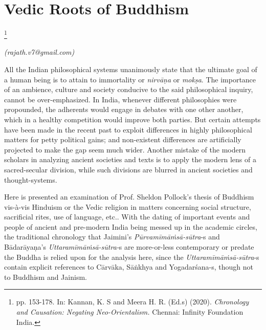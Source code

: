 
\chapter{Vedic Roots of Buddhism}\label{chapter5}

\footnote{pp. 153-178. In: Kannan, K. S and Meera H. R. (Ed.s) (2020). \textit{Chronology and Causation: Negating Neo-Orientalism.} Chennai: Infinity Foundation India.}

\begin{flushright}
\textit{(rajath.v7@gmail.com)}
\end{flushright}

\setcounter{endnote}{0}

All the Indian philosophical systems unanimously state that the ultimate goal of a human being is to attain to immortality or \textit{nirvāṇa} or \textit{mokṣa}. The importance of an ambience, culture and society conducive to the said philosophical inquiry, cannot be over-emphasized. In India, whenever different philosophies were propounded, the adherents would engage in debates with one other another, which in a healthy competition would improve both parties. But certain attempts have been made in the recent past to exploit differences in highly philosophical matters for petty political gains; and non-existent differences are artificially projected to make the gap seem much wider. Another mistake of the modern scholars in analyzing ancient societies and texts is to apply the modern lens of a sacred-secular division, while such divisions are blurred in ancient societies and thought-systems.

Here is presented an examination of Prof. Sheldon Pollock’s thesis of Buddhism vis-à-vis Hinduism or the Vedic religion in matters concerning social structure, sacrificial rites, use of language, etc.. With the dating of important events and people of ancient and pre-modern India being messed up in the academic circles, the traditional chronology that Jaimini’s \textit{Pūrvamīmāṁsā-sūtra}-s and Bādarāyaṇa’s \textit{Uttaramīmāṁsā-sūtra-}s are more-or-less contemporary or predate the Buddha is relied upon for the analysis here, since the \textit{Uttaramīmāṁsā-sūtra}-s contain explicit references to Cārvāka, Sāṅkhya and Yogadarśana-s, though not to Buddhism and Jainism.

